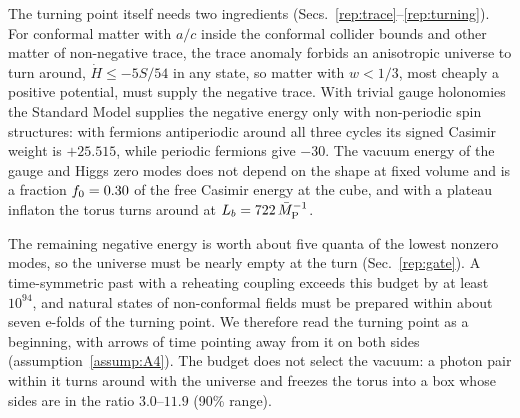 The turning point itself needs two ingredients (Secs.~\ref{rep:trace}--\ref{rep:turning}).
For conformal matter with $a/c$ inside the conformal collider bounds and other matter of non-negative trace, the trace anomaly forbids an anisotropic universe to turn around, $\dot H\leq-5S/54$ in any state, so matter with $w<1/3$, most cheaply a positive potential, must supply the negative trace. %
With trivial gauge holonomies the Standard Model supplies the negative energy only with non-periodic spin structures: with fermions antiperiodic around all three cycles its signed Casimir weight is $+25.515$, while periodic fermions give $-30$. %
The vacuum energy of the gauge and Higgs zero modes does not depend on the shape at fixed volume and is a fraction $f_0=0.30$ of the free Casimir energy at the cube, and with a plateau inflaton the torus turns around at $L_b=722\,\bar M_{\mathrm{P}}^{-1}$. %

The remaining negative energy is worth about five quanta of the lowest nonzero modes, so the universe must be nearly empty at the turn (Sec.~\ref{rep:gate}). %
A time-symmetric past with a reheating coupling exceeds this budget by at least $10^{94}$, and natural states of non-conformal fields must be prepared within about seven e-folds of the turning point. %
We therefore read the turning point as a beginning, with arrows of time pointing away from it on both sides (assumption~\ref{assump:A4}).
The budget does not select the vacuum: a photon pair within it turns around with the universe and freezes the torus into a box whose sides are in the ratio $3.0$--$11.9$ (90\% range). %

